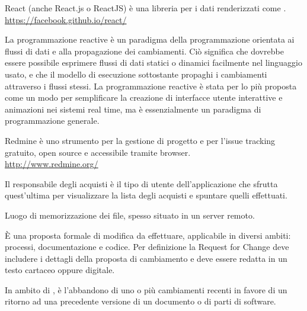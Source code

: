 React (anche React.js o ReactJS) è una libreria   per i dati renderizzati come .\\
\url{https://facebook.github.io/react/}

La programmazione reactive è un paradigma della programmazione orientata ai flussi di dati e alla propagazione dei cambiamenti. Ciò significa che dovrebbe essere possibile esprimere flussi di dati statici o dinamici facilmente nel linguaggio usato, e che il modello di esecuzione sottostante propaghi i cambiamenti attraverso i flussi stessi. La programmazione reactive è stata per lo più proposta come un modo per semplificare la creazione di interfacce utente interattive e animazioni nei sistemi real time, ma è essenzialmente un paradigma di programmazione generale.

Redmine è uno strumento per la gestione di progetto e per l’issue tracking gratuito, open source e accessibile tramite browser.\\ 
\url{http://www.redmine.org/}

Il responsabile degli acquisti è il tipo di utente dell’applicazione che sfrutta quest’ultima per visualizzare la lista degli acquisti e spuntare quelli effettuati.

Luogo di memorizzazione dei file, spesso situato in un server remoto.

È una proposta formale di modifica da effettuare, applicabile in diversi ambiti: processi, documentazione e codice. Per definizione la Request for Change deve includere i dettagli della proposta di cambiamento e deve essere redatta in un testo cartaceo oppure digitale. 

In ambito di , è l'abbandono di uno o più cambiamenti recenti in favore di un ritorno ad una precedente versione di un documento o di parti di software.
\clearpage
